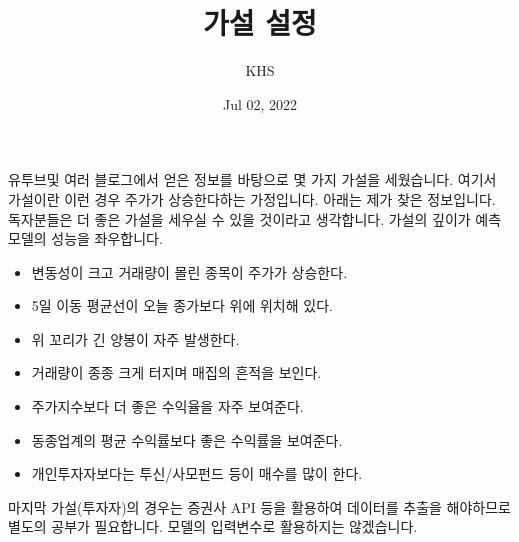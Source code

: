 \documentclass[letterpaper,10pt,english]{jupyterBook}
\title{가설 설정}
\date{Jul 02, 2022}
\author{KHS}
\begin{document}
\pagestyle{empty}
\sphinxmaketitle
\pagestyle{plain}
\sphinxtableofcontents
\pagestyle{normal}
\label{\detokenize{chapter4/4.3.0_My_Strategy::doc}}


\sphinxAtStartPar
유투브및 여러 블로그에서 얻은 정보를 바탕으로 몇 가지 가설을 세웠습니다. 여기서 가설이란 이런 경우 주가가 상승한다하는 가정입니다. 아래는 제가 찾은 정보입니다. 독자분들은 더 좋은 가설을 세우실 수 있을 것이라고 생각합니다. 가설의 깊이가 예측 모델의 성능을 좌우합니다.
\begin{itemize}
\item {} 
\sphinxAtStartPar
변동성이 크고 거래량이 몰린 종목이 주가가 상승한다.

\item {} 
\sphinxAtStartPar
5일 이동 평균선이 오늘 종가보다 위에 위치해 있다.

\item {} 
\sphinxAtStartPar
위 꼬리가 긴 양봉이 자주 발생한다.

\item {} 
\sphinxAtStartPar
거래량이 종종 크게 터지며 매집의 흔적을 보인다.

\item {} 
\sphinxAtStartPar
주가지수보다 더 좋은 수익율을 자주 보여준다.

\item {} 
\sphinxAtStartPar
동종업계의 평균 수익률보다 좋은 수익률을 보여준다.

\item {} 
\sphinxAtStartPar
개인투자자보다는 투신/사모펀드 등이 매수를 많이 한다.

\end{itemize}

\sphinxAtStartPar
마지막 가설(투자자)의 경우는 증권사 API 등을 활용하여 데이터를 추출을 해야하므로 별도의 공부가 필요합니다. 모델의 입력변수로 활용하지는 않겠습니다.







\renewcommand{\indexname}{Index}
\printindex
\end{document}
